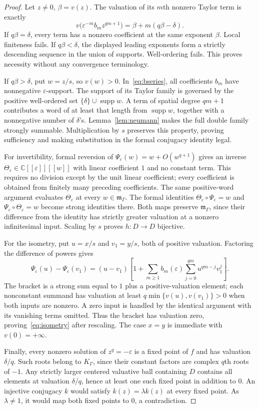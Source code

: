 \documentclass[11pt,a4paper]{article}
\numberwithin{equation}{section}
\theoremstyle{definition}
\theoremstyle{remark}
\newcommand{\C}{\mathbb C}
\newcommand{\K}{K_\Gamma}
\newcommand{\m}{\mathfrak m_\Gamma}
\newcommand{\eps}{\varepsilon}
\newcommand{\supp}{\operatorname{supp}}
\begin{document}
\begin{proof}
Let $z\ne0$, $\beta=v(z)$.  The valuation of its $m$th nonzero Taylor term
is exactly
\begin{equation}\label{eq:termvaluation}
 v\bigl(\eps^{-m}b_m z^{qm+1}\bigr)
       =\beta+m(q\beta-\delta).
\end{equation}
If $q\beta=\delta$, every term has a nonzero coefficient at the same
exponent $\beta$.  Local finiteness fails.  If $q\beta<\delta$, the displayed
leading exponents form a strictly descending sequence in the union of
supports.  Well-ordering fails.  This proves necessity without any
convergence terminology.

If $q\beta>\delta$, put $w=z/s$, so $v(w)>0$.  In~\eqref{eq:bseries},
all coefficients $b_m$ have nonnegative $\eps$-support.  The support of its
Taylor family is governed by the positive well-ordered set
$\{\delta\}\cup\supp w$.  A term of spatial degree $qm+1$ contributes a
word of at least that length from $\supp w$, together with a nonnegative
number of $\delta$'s.  Lemma~\ref{lem:neumann} makes the full double family
strongly summable.  Multiplication by $s$ preserves this property, proving
sufficiency and making substitution in the formal conjugacy identity legal.

For invertibility, formal reversion of
$\Psi_\eps(w)=w+O(w^{q+1})$ gives an inverse
$\Theta_\eps\in\C[[\eps]][[w]]$ with linear coefficient $1$ and no
constant term.  This requires no division except by the unit linear
coefficient; every coefficient is obtained from finitely many preceding
coefficients.  The same positive-word argument evaluates $\Theta_\eps$
at every $w\in\m$.  The formal identities
$\Theta_\eps\circ\Psi_\eps=w$ and
$\Psi_\eps\circ\Theta_\eps=w$ become strong identities there.
Both maps preserve $\m$, since their difference from the identity has
strictly greater valuation at a nonzero infinitesimal input.  Scaling by
$s$ proves $h:D\to D$ bijective.

For the isometry, put $u=x/s$ and $v_1=y/s$, both of positive valuation.
Factoring the difference of powers gives
\[
 \Psi_\eps(u)-\Psi_\eps(v_1)
  =(u-v_1)\left[1+\sum_{m\ge1}b_m(\eps)
       \sum_{j=0}^{qm}u^{qm-j}v_1^j\right].
\]
The bracket is a strong sum equal to $1$ plus a positive-valuation element;
each nonconstant summand has valuation at least
$q\min\{v(u),v(v_1)\}>0$ when both inputs are nonzero.  A zero input is
handled by the identical argument with its vanishing terms omitted.
Thus the bracket has valuation zero, proving~\eqref{eq:isometry} after
rescaling.  The case $x=y$ is immediate with $v(0)=+\infty$.

Finally, every nonzero solution of $z^q=-\eps$ is a fixed point of $f$ and
has valuation $\delta/q$.  Such roots belong to $\K$, since their constant
factors are complex $q$th roots of $-1$.  Any strictly larger centered
valuative ball containing $D$ contains all elements at valuation
$\delta/q$, hence at least one such fixed point in addition to $0$.
An injective conjugacy $k$ would satisfy
$k(z)=\lambda k(z)$ at every fixed point.  As $\lambda\ne1$, it would map
both fixed points to $0$, a contradiction.
\end{proof}
\end{document}

